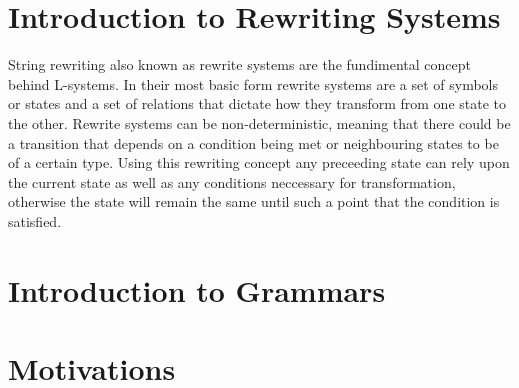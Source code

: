 \section{Introduction to Rewriting Systems}

\begin{flushleft}

String rewriting also known as rewrite systems are the fundimental concept behind L-systems. In their most basic form rewrite systems are a set of symbols or states and a set of relations that dictate how they transform from one state to the other. Rewrite systems can be non-deterministic, meaning that there could be a transition that depends on a condition being met or neighbouring states to be of a certain type. Using this rewriting concept any preceeding state can rely upon the current state as well as any conditions neccessary for transformation, otherwise the state will remain the same until such a point that the condition is satisfied. 

\end{flushleft}

\section{Introduction to Grammars}

\begin{flushleft}

\end{flushleft}

\section{Motivations}
 
